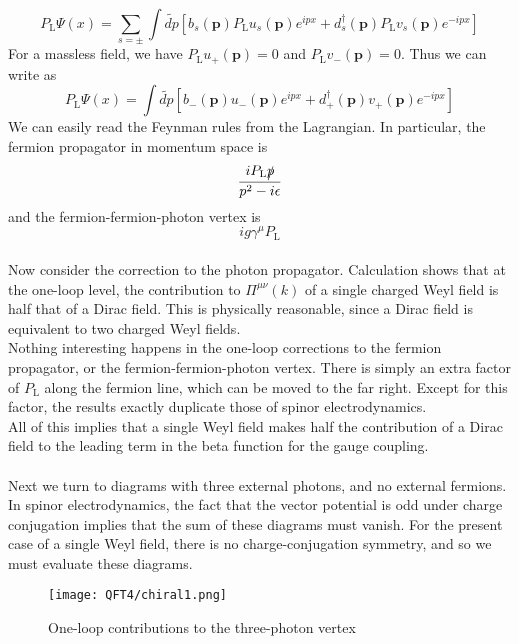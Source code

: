 \[P_{\mathrm{L}}\Psi(x) = \sum_{s = \pm} \int \tilde{dp} [b_s(\bm{p})P_{\mathrm{L}}u_s(\bm{p})e^{ipx} + d_s^{\dagger}(\bm{p})P_{\mathrm{L}} v_s(\bm{p}) e^{-ipx}]\]
For a massless field, we have $P_{\mathrm{L}} u_{+}(\bm{p}) = 0$ and $P_{\mathrm{L}} v_-(\bm{p}) = 0$. Thus we can write as
\[P_{\mathrm{L}}\Psi(x) =  \int \tilde{dp} [b_-(\bm{p})u_-(\bm{p})e^{ipx} + d_+^{\dagger}(\bm{p}) v_+(\bm{p}) e^{-ipx}]\]
We can easily read the Feynman rules from the Lagrangian. In particular, the fermion propagator in momentum space is
\[\frac{iP_{\mathrm{L}}\slashed{p}}{p^2-i\epsilon}\]
and the fermion-fermion-photon vertex is
\[ig\gamma^{\mu} P_{\mathrm{L}}\]
\\
Now consider the correction to the photon propagator. Calculation shows that at the one-loop level, the contribution to $\Pi^{\mu\nu}(k)$ of a single charged Weyl field is half that of a Dirac field. This is physically reasonable, since a Dirac field is equivalent to two charged Weyl fields.
\\
Nothing interesting happens in the one-loop corrections to the fermion propagator, or the fermion-fermion-photon vertex. There is simply an extra factor of $P_{\mathrm{L}}$ along the fermion line, which can be moved to the far right. Except for this factor, the results exactly duplicate those of spinor electrodynamics.
\\
All of this implies that a single Weyl field makes half the contribution of a Dirac field to the leading term in the beta function for the gauge coupling.
\\ \\
Next we turn to diagrams with three external photons, and no external fermions. In spinor electrodynamics, the fact that the vector potential is odd under charge conjugation implies that the sum of these diagrams must vanish. For the present case of a single Weyl field, there is no charge-conjugation symmetry, and so we must evaluate these diagrams.
\begin{figure}[!h]
	\centering
	\texttt{[image: QFT4/chiral1.png]}
	\caption{One-loop contributions to the three-photon vertex}
\end{figure}

